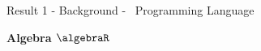 \begin{frame}{Result 1 - Background - \WhileCC\ Programming Language}
\begin{minipage}[t]{0.33\linewidth}
\begin{itemize}
            \end{itemize}
    \end{minipage}
    \begin{minipage}[t]{0.34\linewidth}
         \pause 
         \begin{center}
            \vspace{-1.8em}
             \textbf{\color{Blue}Algebra $\algebraR$}
         \end{center}
         \begin{center}
        \end{center}
        

\end{minipage}
\end{frame}
